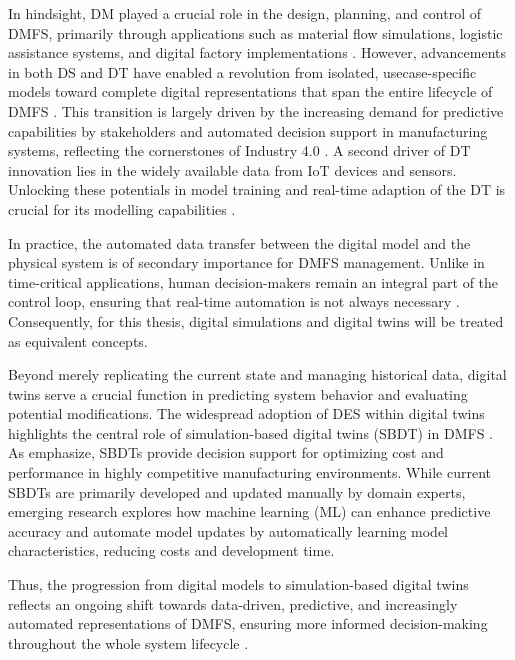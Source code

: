 In hindsight, DM played a crucial role in the design, planning, and control of DMFS, primarily through applications such as material flow simulations, logistic assistance systems, and digital factory implementations \parencite{Thiede2013}. However, advancements in both DS and DT have enabled a revolution from isolated, usecase-specific models toward complete digital representations that span the entire lifecycle of DMFS \parencite{Abdoune2023}. This transition is largely driven by the increasing demand for predictive capabilities by stakeholders and automated decision support in manufacturing systems, reflecting the cornerstones of Industry 4.0 \parencite{frank2019industry}. A second driver of DT innovation lies in the widely available data from IoT devices and sensors. Unlocking these potentials in model training and real-time adaption of the DT is crucial for its modelling capabilities \parencite{Tao2018ijamt}.

In practice, the automated data transfer between the digital model and the physical system is of secondary importance for DMFS management. Unlike in time-critical applications, human decision-makers remain an integral part of the control loop, ensuring that real-time automation is not always necessary \parencite{schwede2024learning}. Consequently, for this thesis, digital simulations and digital twins will be treated as equivalent concepts.

Beyond merely replicating the current state and managing historical data, digital twins serve a crucial function in predicting system behavior and evaluating potential modifications. The widespread adoption of DES within digital twins highlights the central role of simulation-based digital twins (SBDT) in DMFS \parencite{Lugaresi2021aifac}. As \citeauthor{schwede2024learning} emphasize, SBDTs provide decision support for optimizing cost and performance in highly competitive manufacturing environments. While current SBDTs are primarily developed and updated manually by domain experts, emerging research explores how machine learning (ML) can enhance predictive accuracy and automate model updates by automatically learning model characteristics, reducing costs and development time.

Thus, the progression from digital models to simulation-based digital twins reflects an ongoing shift towards data-driven, predictive, and increasingly automated representations of DMFS, ensuring more informed decision-making throughout the whole system lifecycle \parencite{boschert2016digital,lim2020state}.

